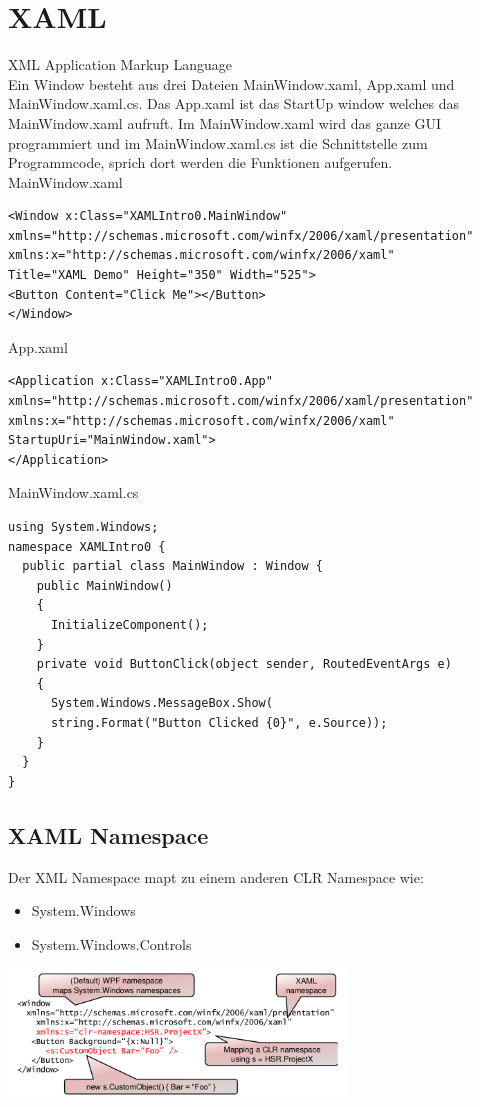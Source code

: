\section{XAML}
XML Application Markup Language\\

Ein Window besteht aus drei Dateien MainWindow.xaml, App.xaml und MainWindow.xaml.cs.
Das App.xaml ist das StartUp window welches das MainWindow.xaml aufruft. Im MainWindow.xaml wird
das ganze GUI programmiert und im MainWindow.xaml.cs ist die Schnittstelle zum Programmcode, sprich
dort werden die Funktionen aufgerufen.\\

MainWindow.xaml
\begin{lstlisting}[style=CSharp]
<Window x:Class="XAMLIntro0.MainWindow"
xmlns="http://schemas.microsoft.com/winfx/2006/xaml/presentation"
xmlns:x="http://schemas.microsoft.com/winfx/2006/xaml"
Title="XAML Demo" Height="350" Width="525">
<Button Content="Click Me"></Button>
</Window>
\end{lstlisting}

App.xaml
\begin{lstlisting}[style=CSharp]
<Application x:Class="XAMLIntro0.App"
xmlns="http://schemas.microsoft.com/winfx/2006/xaml/presentation"
xmlns:x="http://schemas.microsoft.com/winfx/2006/xaml"
StartupUri="MainWindow.xaml">
</Application>
\end{lstlisting}

MainWindow.xaml.cs
\begin{lstlisting}[style=CSharp]
using System.Windows;
namespace XAMLIntro0 {
  public partial class MainWindow : Window {
    public MainWindow()
    {
      InitializeComponent();
    }
    private void ButtonClick(object sender, RoutedEventArgs e)
    {
      System.Windows.MessageBox.Show(
      string.Format("Button Clicked {0}", e.Source));
    }
  }
}
\end{lstlisting}

\subsection{XAML Namespace }
\begin{multicols}{2}

Der XML Namespace mapt zu einem anderen CLR Namespace wie:
\begin{itemize}
  \item System.Windows
  \item System.Windows.Controls
\end{itemize}

\columnbreak

\includegraphics[width=9cm]{images/XAML/namespaces}
\end{multicols}

